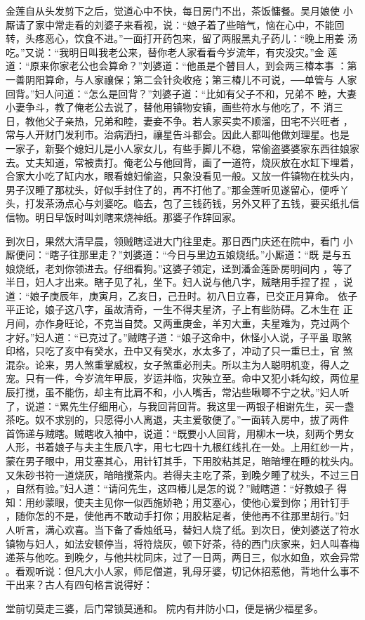 金莲自从头发剪下之后，觉道心中不快，每日房门不出，茶饭慵餐。吴月娘使
小厮请了家中常走看的刘婆子来看视，说：“娘子着了些暗气，恼在心中，不能回
转，头疼恶心，饮食不进。”一面打开药包来，留了两服黑丸子药儿：“晚上用姜
汤吃。”又说：“我明日叫我老公来，替你老人家看看今岁流年，有灾没灾。”金
莲道：“原来你家老公也会算命？”刘婆道：“他虽是个瞽目人，到会两三椿本事
：第一善阴阳算命，与人家禳保；第二会针灸收疮；第三椿儿不可说，──单管与
人家回背。”妇人问道：“怎么是回背？”刘婆子道：“比如有父子不和，兄弟不
睦，大妻小妻争斗，教了俺老公去说了，替他用镇物安镇，画些符水与他吃了，不
消三日，教他父子亲热，兄弟和睦，妻妾不争。若人家买卖不顺溜，田宅不兴旺者
，常与人开财门发利市。治病洒扫，禳星告斗都会。因此人都叫他做刘理星。也是
一家子，新娶个媳妇儿是小人家女儿，有些手脚儿不稳，常偷盗婆婆家东西往娘家
去。丈夫知道，常被责打。俺老公与他回背，画了一道符，烧灰放在水缸下埋着，
合家大小吃了缸内水，眼看媳妇偷盗，只象没看见一般。又放一件镇物在枕头内，
男子汉睡了那枕头，好似手封住了的，再不打他了。”那金莲听见遂留心，便呼丫
头，打发茶汤点心与刘婆吃。临去，包了三钱药钱，另外又秤了五钱，要买纸扎信
信物。明日早饭时叫刘瞎来烧神纸。那婆子作辞回家。

到次日，果然大清早晨，领贼瞎迳进大门往里走。那日西门庆还在院中，看门
小厮便问：“瞎子往那里走？”刘婆道：“今日与里边五娘烧纸。”小厮道：“既
是与五娘烧纸，老刘你领进去。仔细看狗。”这婆子领定，迳到潘金莲卧房明间内
，等了半日，妇人才出来。瞎子见了礼，坐下。妇人说与他八字，贼瞎用手捏了捏
，说道：“娘子庚辰年，庚寅月，乙亥日，己丑时。初八日立春，已交正月算命。
依子平正论，娘子这八字，虽故清奇，一生不得夫星济，子上有些防碍。乙木生在
正月间，亦作身旺论，不克当自焚。又两重庚金，羊刃大重，夫星难为，克过两个
才好。”妇人道：“已克过了。”贼瞎子道：“娘子这命中，休怪小人说，子平虽
取煞印格，只吃了亥中有癸水，丑中又有癸水，水太多了，冲动了只一重巳土，官
煞混杂。论来，男人煞重掌威权，女子煞重必刑夫。所以主为人聪明机变，得人之
宠。只有一件，今岁流年甲辰，岁运并临，灾殃立至。命中又犯小耗勾绞，两位星
辰打搅，虽不能伤，却主有比肩不和，小人嘴舌，常沾些啾唧不宁之状。”妇人听
了，说道：“累先生仔细用心，与我回背回背。我这里一两银子相谢先生，买一盏
茶吃。奴不求别的，只愿得小人离退，夫主爱敬便了。”一面转入房中，拔了两件
首饰递与贼瞎。贼瞎收入袖中，说道：“既要小人回背，用柳木一块，刻两个男女
人形，书着娘子与夫主生辰八字，用七七四十九根红线扎在一处。上用红纱一片，
蒙在男子眼中，用艾塞其心，用针钉其手，下用胶粘其足，暗暗埋在睡的枕头内。
又朱砂书符一道烧灰，暗暗搅茶内。若得夫主吃了茶，到晚夕睡了枕头，不过三日
，自然有验。”妇人道：“请问先生，这四椿儿是怎的说？”贼瞎道：“好教娘子
得知：用纱蒙眼，使夫主见你一似西施娇艳；用艾塞心，使他心爱到你；用针钉手
，随你怎的不是，使他再不敢动手打你；用胶粘足者，使他再不往那里胡行。”妇
人听言，满心欢喜。当下备了香烛纸马，替妇人烧了纸。到次日，使刘婆送了符水
镇物与妇人，如法安顿停当，将符烧灰，顿下好茶，待的西门庆家来，妇人叫春梅
递茶与他吃。到晚夕，与他共枕同床，过了一日两，两日三，似水如鱼，欢会异常
。看观听说：但凡大小人家，师尼僧道，乳母牙婆，切记休招惹他，背地什么事不
干出来？古人有四句格言说得好：

堂前切莫走三婆，后门常锁莫通和。
院内有井防小口，便是祸少福星多。